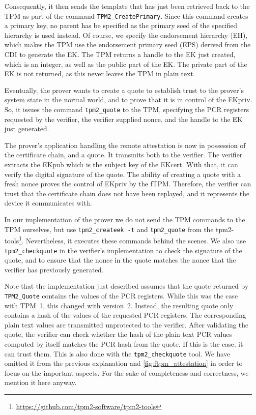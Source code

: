 Consequently, it then sends the template that has just been retrieved back to the TPM as part of the command \texttt{TPM2\_CreatePrimary}.
Since this command creates a primary key, no parent has be specified as the primary seed of the specified hierarchy is used instead.
Of course, we specify the endorsement hierarchy (EH), which makes the TPM use the endorsement primary seed (EPS) derived from the CDI to generate the EK\@.
The TPM returns a handle to the EK just created, which is an integer, as well as the public part of the EK\@.
The private part of the EK is not returned, as this never leaves the TPM in plain text.

Eventually, the prover wants to create a quote to establish trust to the prover's system state in the normal world, and to prove that it is in control of the EKpriv.
So, it issues the command \texttt{tpm2\_quote} to the TPM, specifying the PCR registers requested by the verifier, the verifier supplied nonce, and the handle to the EK just generated.

The prover's application handling the remote attestation is now in possession of the certificate chain, and a quote.
It transmits both to the verifier.
The verifier extracts the EKpub which is the subject key of the EKcert.
With that, it can verify the digital signature of the quote.
The ability of creating a quote with a fresh nonce proves the control of EKpriv by the fTPM\@.
Therefore, the verifier can trust that the certificate chain does not have been replayed, and it represents the device it communicates with.

In our implementation of the prover we do not send the TPM commands to the TPM ourselves, but use \texttt{tpm2\_createek~-t} and \texttt{tpm2\_quote} from the tpm2-tools\footnote{\url{https://github.com/tpm2-software/tpm2-tools}}.
Nevertheless, it executes these commands behind the scenes.
We also use \texttt{tpm2\_checkquote} in the verifier's implementation to check the signature of the quote, and to ensure that the nonce in the quote matches the nonce that the verifier has previously generated.

Note that the implementation just described assumes that the quote returned by \texttt{TPM2\_Quote} contains the values of the PCR registers.
While this was the case with TPM~1, this changed with version~2.
Instead, the resulting quote only contains a hash of the values of the requested PCR registers.
The corresponding plain text values are transmitted unprotected to the verifier.
After validating the quote, the verifier can check whether the hash of the plain text PCR values computed by itself matches the PCR hash from the quote.
If this is the case, it can trust them.
This is also done with the \texttt{tpm2\_checkquote} tool.
We have omitted it from the previous explanation and \autoref{fig:ftpm_attestation} in order to focus on the important aspects.
For the sake of completeness and correctness, we mention it here anyway.

